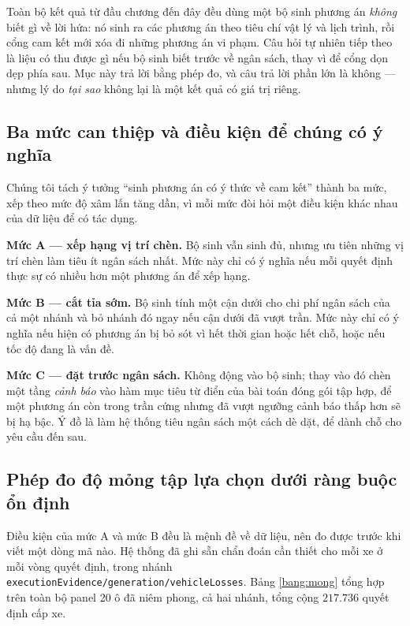 Toàn bộ kết quả từ đầu chương đến đây đều dùng một bộ sinh phương án \emph{không} biết gì về
lời hứa: nó sinh ra các phương án theo tiêu chí vật lý và lịch trình, rồi cổng cam kết mới xóa
đi những phương án vi phạm. Câu hỏi tự nhiên tiếp theo là liệu có thu được gì nếu bộ sinh biết
trước về ngân sách, thay vì để cổng dọn dẹp phía sau. Mục này trả lời bằng phép đo, và câu trả
lời phần lớn là không --- nhưng lý do \emph{tại sao} không lại là một kết quả có giá trị riêng.

\subsection{Ba mức can thiệp và điều kiện để chúng có ý nghĩa}

Chúng tôi tách ý tưởng ``sinh phương án có ý thức về cam kết'' thành ba mức, xếp theo mức độ
xâm lấn tăng dần, vì mỗi mức đòi hỏi một điều kiện khác nhau của dữ liệu để có tác dụng.

\textbf{Mức A --- xếp hạng vị trí chèn.} Bộ sinh vẫn sinh đủ, nhưng ưu tiên những vị trí chèn
làm tiêu ít ngân sách nhất. Mức này chỉ có ý nghĩa nếu mỗi quyết định thực sự có nhiều hơn một
phương án để xếp hạng.

\textbf{Mức B --- cắt tỉa sớm.} Bộ sinh tính một cận dưới cho chi phí ngân sách của cả một
nhánh và bỏ nhánh đó ngay nếu cận dưới đã vượt trần. Mức này chỉ có ý nghĩa nếu hiện có phương
án bị bỏ sót vì hết thời gian hoặc hết chỗ, hoặc nếu tốc độ đang là vấn đề.

\textbf{Mức C --- đặt trước ngân sách.} Không động vào bộ sinh; thay vào đó chèn một tầng
\emph{cảnh báo} vào hàm mục tiêu từ điển của bài toán đóng gói tập hợp, để một phương án còn
trong trần cứng nhưng đã vượt ngưỡng cảnh báo thấp hơn sẽ bị hạ bậc. Ý đồ là làm hệ thống tiêu
ngân sách một cách dè dặt, để dành chỗ cho yêu cầu đến sau.

\subsection{Phép đo độ mỏng tập lựa chọn dưới ràng buộc ổn định}

Điều kiện của mức A và mức B đều là mệnh đề về dữ liệu, nên đo được trước khi viết một dòng mã
nào. Hệ thống đã ghi sẵn chẩn đoán cần thiết cho mỗi xe ở mỗi vòng quyết định, trong nhánh
\texttt{executionEvidence/generation/vehicleLosses}. Bảng \ref{bang:mong} tổng hợp trên toàn bộ
panel 20 ô đã niêm phong, cả hai nhánh, tổng cộng $217.736$ quyết định cấp xe.

